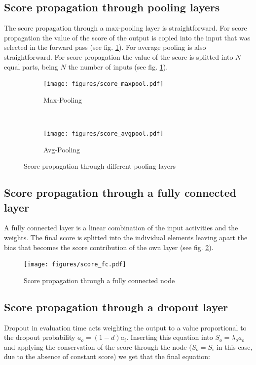 \documentclass[preprint]{elsarticle}
\theoremstyle{definition} %
\theoremstyle{remark}
\begin{document}
\subsection{Score propagation through pooling layers}

The score propagation through a max-pooling layer is straightforward. For score propagation the value of the score of the output is copied into the input that was selected in the forward pass (see fig. \ref{fig:score_pooling}). For average pooling is also straightforward. For score propagation the value of the score is splitted into $N$ equal parts, being $N$ the number of inputs (see fig. \ref{fig:score_pooling}).

\begin{figure}[h!]
	\centering
	\begin{subfigure}{0.4\textwidth}
		\texttt{[image: figures/score\_maxpool.pdf]}
		\caption{Max-Pooling}
	\end{subfigure}
	~ %
	\begin{subfigure}{0.4\textwidth}
		\texttt{[image: figures/score\_avgpool.pdf]}
		\caption{Avg-Pooling}
	\end{subfigure}
	\caption{Score propagation through different pooling layers}
	\label{fig:score_pooling}
\end{figure}

\subsection{Score propagation through a fully connected layer} 

A fully connected layer is a linear combination of the input activities and the weights. The final score is splitted into the individual elements leaving apart the bias that becomes the score contribution of the own layer (see fig. \ref{fig:score_fc}).

\begin{figure}[h!]
	\centering
	\texttt{[image: figures/score\_fc.pdf]}
	\caption{Score propagation through a fully connected node}
	\label{fig:score_fc}
\end{figure}

\subsection{Score propagation through a dropout layer}

Dropout in evaluation time acts weighting the output to a value proportional to the dropout probability $a_o = (1-d)a_i$. Inserting this equation into $S_o = \lambda_o a_o$ and applying the conservation of the score through the node ($S_o = S_i$ in this case, due to the absence of constant score) we get that the final equation:
\end{document}

